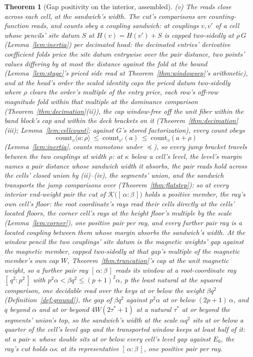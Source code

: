 \documentclass[11pt]{article}
\newtheorem{theorem}{Theorem}
\theoremstyle{definition}
\begin{document}
\begin{theorem}[Gap positivity on the interior, assembled]
\emph{(v) The reads close across each cell, at the sandwich's
width.} The cut's
comparisons are counting-function reads, and counts obey a coupling
sandwich: at couplings $v,v'$ of a cell whose pencils' site datum
$S$ at $H(v)=H(v')+S$ is
capped two-sidedly at $\rho\,G$ (Lemma~\ref{lem:inertia}) per decimated
head: the decimated entries' derivative coefficient folds price the
site datum entrywise over the pair distance, two points' values
differing by at most the distance against the fold at the bound
(Lemma~\ref{lem:stage}'s priced side read at
Theorem~\ref{thm:windowsep}'s arithmetic), and at the head's order
the scaled identity caps the priced datum two-sidedly where $\rho$
clears the order's multiple of the entry price, each row's off-row
magnitude fold within that multiple at the dominance comparison
(Theorem~\ref{thm:decimation}(ii)), the cap window-free
off the unit fiber within the band block's cap and within the deck
brackets on it
(Theorem~\ref{thm:decimation}(iii); Lemma~\ref{lem:cellcount};
against $G$'s stored factorization), every count obeys
\[
\mathrm{count}_v\langle a\!:\!\rho\rangle\ \le\ \mathrm{count}_{v'}(a)\ \le\
\mathrm{count}_v(a+\rho)
\]
(Lemma~\ref{lem:inertia}, counts monotone under $\preceq$), so every
jump bracket travels between the two couplings at width $\rho$: at
$\kappa$ below a cell's level, the level's margin names a pair
distance whose sandwich width it absorbs, the pair reads hold
across the cells' closed union by (ii)--(iv), the segments' union,
and the sandwich transports the jump comparisons over
(Theorem~\ref{thm:flatstep}): so
at every interior end-weight pair the cut of
$\mathcal K\big([\,\alpha:\beta\,]\big)$ holds a positive member,
the ray's own cell's floor: the root coordinate's rays read their
cells directly at the cells' located floors, the corner cell's rays
at the height floor's multiple by the scale
(Lemma~\ref{lem:corner}), one positive pair per ray, and every
further pair ray is a located coupling between them whose margin
absorbs the sandwich's width. At the window pencil the two
couplings' site datum is the magnetic weights' gap against the
magnetic member, capped two-sidedly at that gap's multiple of the
magnetic member's own cap $W$, Theorem~\ref{thm:truncation}'s cap at
the unit magnetic weight, so a further pair ray
$[\,\alpha:\beta\,]$ reads its window at a root-coordinate ray
$[\,q^{2}:p^{2}\,]$ with $p^{2}\alpha<\beta q^{2}\le(p+1)^{2}\alpha$,
$p$ the least natural at the squared comparison, one decidable read
over the keys at or below the weight $\beta q^{2}$
(Definition~\ref{def:ground}), the gap of $\beta q^{2}$ against
$p^{2}\alpha$ at or below $(2p+1)\,\alpha$, and $q$ beyond $\alpha$
and at or beyond $4W(2\tau^{\ast}+1)$ at a natural $\tau^{\ast}$ at
or beyond the segments' union's top, so the sandwich's width at the
scale $\alpha q^{2}$ sits at or below a quarter of the cell's level
gap and the transported window keeps at least half of it: at a pair
$\kappa$ whose double sits at or below every cell's level gap
against $E_0$, the ray's cut holds $\alpha\kappa$ at its
representative $[\,\alpha:\beta\,]$, one positive pair per ray.

\end{theorem}
\end{document}
